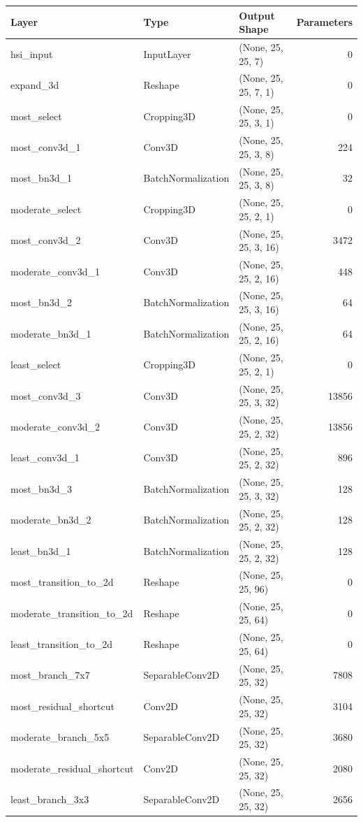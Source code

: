 \begin{tabular}{lllr}
\toprule
Layer & Type & Output Shape & Parameters \\
\midrule
hsi_input & InputLayer & (None, 25, 25, 7) & 0 \\
expand_3d & Reshape & (None, 25, 25, 7, 1) & 0 \\
most_select & Cropping3D & (None, 25, 25, 3, 1) & 0 \\
most_conv3d_1 & Conv3D & (None, 25, 25, 3, 8) & 224 \\
most_bn3d_1 & BatchNormalization & (None, 25, 25, 3, 8) & 32 \\
moderate_select & Cropping3D & (None, 25, 25, 2, 1) & 0 \\
most_conv3d_2 & Conv3D & (None, 25, 25, 3, 16) & 3472 \\
moderate_conv3d_1 & Conv3D & (None, 25, 25, 2, 16) & 448 \\
most_bn3d_2 & BatchNormalization & (None, 25, 25, 3, 16) & 64 \\
moderate_bn3d_1 & BatchNormalization & (None, 25, 25, 2, 16) & 64 \\
least_select & Cropping3D & (None, 25, 25, 2, 1) & 0 \\
most_conv3d_3 & Conv3D & (None, 25, 25, 3, 32) & 13856 \\
moderate_conv3d_2 & Conv3D & (None, 25, 25, 2, 32) & 13856 \\
least_conv3d_1 & Conv3D & (None, 25, 25, 2, 32) & 896 \\
most_bn3d_3 & BatchNormalization & (None, 25, 25, 3, 32) & 128 \\
moderate_bn3d_2 & BatchNormalization & (None, 25, 25, 2, 32) & 128 \\
least_bn3d_1 & BatchNormalization & (None, 25, 25, 2, 32) & 128 \\
most_transition_to_2d & Reshape & (None, 25, 25, 96) & 0 \\
moderate_transition_to_2d & Reshape & (None, 25, 25, 64) & 0 \\
least_transition_to_2d & Reshape & (None, 25, 25, 64) & 0 \\
most_branch_7x7 & SeparableConv2D & (None, 25, 25, 32) & 7808 \\
most_residual_shortcut & Conv2D & (None, 25, 25, 32) & 3104 \\
moderate_branch_5x5 & SeparableConv2D & (None, 25, 25, 32) & 3680 \\
moderate_residual_shortcut & Conv2D & (None, 25, 25, 32) & 2080 \\
least_branch_3x3 & SeparableConv2D & (None, 25, 25, 32) & 2656 \\

\end{tabular}
